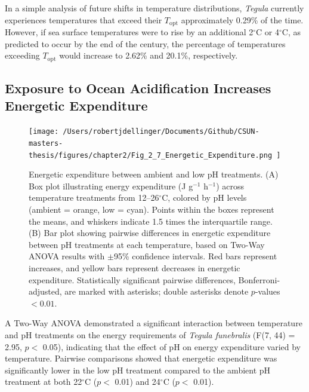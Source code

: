 \documentclass{CSUNthesis}
\begin{document}
In a simple analysis of future shifts in temperature distributions, \textit{Tegula} currently experiences temperatures that exceed their \(T_{\text{opt}}\) approximately 0.29\% of the time. However, if sea surface temperatures were to rise by an additional 2\(^\circ\)C or 4\(^\circ\)C, as predicted to occur by the end of the century, the percentage of temperatures exceeding \(T_{\text{opt}}\) would increase to 2.62\% and 20.1\%, respectively.

\subsection*{Exposure to Ocean Acidification Increases Energetic Expenditure}\label{exposure-to-ocean-acidification-increases-energetic-expenditure}

\begin{figure}[H]
  \centering
  \texttt{[image:  /Users/robertjdellinger/Documents/Github/CSUN-masters-thesis/figures/chapter2/Fig\_2\_7\_Energetic\_Expenditure.png ]}
  \caption[Energetic expenditure between ambient and low pH treatments.]{Energetic expenditure between ambient and low pH treatments. (A) Box plot illustrating energy expenditure (J g$^{-1}$ h$^{-1}$) across temperature treatments from 12--26$^\circ$C, colored by pH levels (ambient = orange, low = cyan). Points within the boxes represent the means, and whiskers indicate 1.5 times the interquartile range. (B) Bar plot showing pairwise differences in energetic expenditure between pH treatments at each temperature, based on Two-Way ANOVA results with $\pm$95\% confidence intervals. Red bars represent increases, and yellow bars represent decreases in energetic expenditure. Statistically significant pairwise differences, Bonferroni-adjusted, are marked with asterisks; double asterisks denote $p$-values $< 0.01$.}
  \label{fig:energetic_expenditure}
\end{figure}

A Two-Way ANOVA demonstrated a significant interaction between temperature and pH treatments on the energy requirements of \textit{Tegula funebralis} (F(7, 44) = 2.95, \(p <\) 0.05), indicating that the effect of pH on energy expenditure varied by temperature. Pairwise comparisons showed that energetic expenditure was significantly lower in the low pH treatment compared to the ambient pH treatment at both 22\(^\circ\)C (\(p <\) 0.01) and 24\(^\circ\)C (\(p <\) 0.01).
\end{document}
